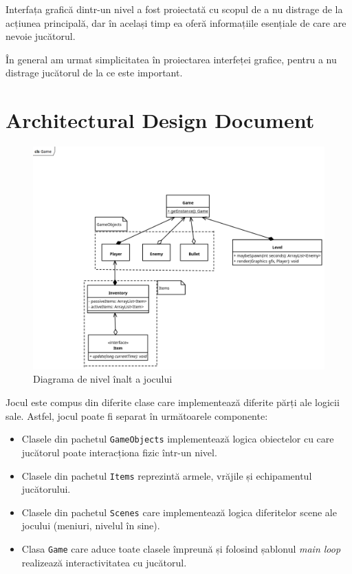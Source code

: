 \documentclass{article}
\begin{document}
    Interfața grafică dintr-un nivel a fost proiectată cu scopul de a nu distrage de
    la acțiunea principală, dar în același timp ea oferă informațiile esențiale de care are
    nevoie jucătorul.

    În general am urmat simplicitatea în proiectarea interfeței grafice, pentru a nu distrage
    jucătorul de la ce este important.


    \section{Architectural Design Document}
    \FloatBarrier
    \begin{figure}[H]
        \includegraphics[width=\linewidth]{high-level-diagram}
        \centering
        \caption{Diagrama de nivel înalt a jocului}
    \end{figure}

    Jocul este compus din diferite clase care implementează diferite părți ale logicii sale. Astfel,
    jocul poate fi separat în următoarele componente:
    \begin{itemize}
        \item Clasele din pachetul \texttt{GameObjects} implementează logica obiectelor cu care
        jucătorul poate interacționa fizic într-un nivel.
        \item Clasele din pachetul \texttt{Items} reprezintă armele, vrăjile și echipamentul
        jucătorului.
        \item Clasele din pachetul \texttt{Scenes} care implementează logica diferitelor scene ale
        jocului (meniuri, nivelul în sine).
        \item Clasa \texttt{Game} care aduce toate clasele împreună și folosind șablonul
        \emph{main loop} realizează interactivitatea cu jucătorul.
    \end{itemize}
\end{document}
